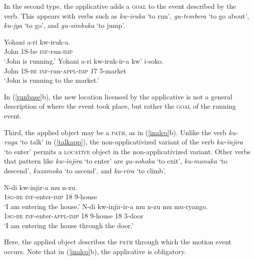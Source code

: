 \documentclass[output=paper]{langsci/langscibook}
\begin{document}
In the second type, the applicative adds a {\scshape goal} to the event described by the verb. This appears with verbs such as \emph{kw-iruka} `to run', \emph{gu-tembera} `to go about', \emph{ku-jya} `to go', and  \emph{gu-simbuka} `to jump'.
	\begin{exe}
		\ex\label{runbase}\begin{xlist}
		\ex\gll Yohani a-ri kw-iruk-a.\\	
				John 1S-be {\scshape inf}-run-{\scshape imp}\\
				\glt `John is running.'
		\ex\gll Yohani a-ri kw-iruk-ir-a kw' i-soko.\\
				John 	1S-{\scshape be} {\scshape inf-}run-{\scshape appl-imp} 17 5-market \\
				\glt `John is running to the market.'
		\end{xlist}
		\end{exe}
%
 In (\ref{runbase}b), the new location licensed by the applicative is not a general description of where the event took place, but rather the {\scshape goal}  of the running event.
 
 Third, the applied object may be a {\scshape path}, as in (\ref{inalco}b). Unlike the verb \emph{ku-vuga} `to talk' in (\ref{talkapp}), the non-applicativized variant of the verb \emph{kw-injira} `to enter' permits a {\scshape locative} object in the non-applicativized variant.  Other verbs that pattern like \emph{kw-injira} `to enter' are \emph{gu-sohoka} `to exit', \emph{ku-manuka} `to descend', \emph{kuzamoka} `to ascend', and \emph{ku-rira} `to climb'.

\begin{exe}
	\ex\label{inalco}\begin{xlist}
		\ex\gll N-di kw-injir-a mu n-zu.\\
				1{\scshape sg-be} {\scshape inf-}enter-{\scshape imp} 18 9-house\\
				\glt `I am entering the house.'
		\ex\gll N-di kw-injir-ir-a mu n-zu mu mu-ryango.\\
				1{\scshape sg-be} {\scshape inf-}enter-{\scshape appl-imp} 18 9-house 18 3-door\\
				\glt `I am entering the house through the door.'
	\end{xlist}
\end{exe}
%
 Here, the applied object describes the {\scshape path}  through which the motion event occurs. Note that in (\ref{inalco}b), the applicative is obligatory.%
\end{document}
